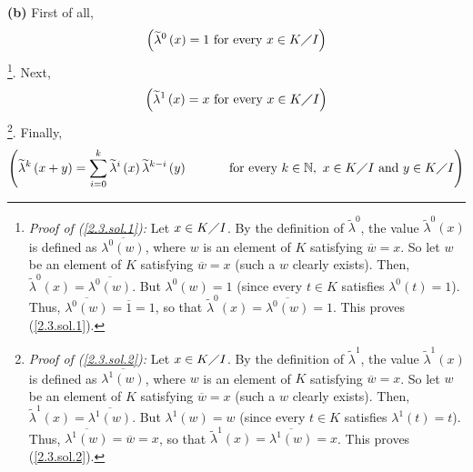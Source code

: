 \documentclass[numbers=enddot,12pt,final,onecolumn,notitlepage]{scrartcl}%
\begin{document}
\textbf{(b)} First of all,%
\begin{equation}
\left(  \widetilde{\lambda}^{0}\left(  x\right)  =1\text{ for every }x\in
K\diagup I\right)  \label{2.3.sol.1}%
\end{equation}
\footnote{\textit{Proof of (\ref{2.3.sol.1}):} Let $x\in K\diagup I$. By the
definition of $\widetilde{\lambda}^{0}$, the value $\widetilde{\lambda}%
^{0}\left(  x\right)  $ is defined as $\overline{\lambda^{0}\left(  w\right)
}$, where $w$ is an element of $K$ satisfying $\overline{w}=x$. So let $w$ be
an element of $K$ satisfying $\overline{w}=x$ (such a $w$ clearly exists).
Then, $\widetilde{\lambda}^{0}\left(  x\right)  =\overline{\lambda^{0}\left(
w\right)  }$. But $\lambda^{0}\left(  w\right)  =1$ (since every $t\in K$
satisfies $\lambda^{0}\left(  t\right)  =1$). Thus, $\overline{\lambda
^{0}\left(  w\right)  }=\overline{1}=1$, so that $\widetilde{\lambda}%
^{0}\left(  x\right)  =\overline{\lambda^{0}\left(  w\right)  }=1$. This
proves (\ref{2.3.sol.1}).}. Next,%
\begin{equation}
\left(  \widetilde{\lambda}^{1}\left(  x\right)  =x\text{ for every }x\in
K\diagup I\right)  \label{2.3.sol.2}%
\end{equation}
\footnote{\textit{Proof of (\ref{2.3.sol.2}):} Let $x\in K\diagup I$. By the
definition of $\widetilde{\lambda}^{1}$, the value $\widetilde{\lambda}%
^{1}\left(  x\right)  $ is defined as $\overline{\lambda^{1}\left(  w\right)
}$, where $w$ is an element of $K$ satisfying $\overline{w}=x$. So let $w$ be
an element of $K$ satisfying $\overline{w}=x$ (such a $w$ clearly exists).
Then, $\widetilde{\lambda}^{1}\left(  x\right)  =\overline{\lambda^{1}\left(
w\right)  }$. But $\lambda^{1}\left(  w\right)  =w$ (since every $t\in K$
satisfies $\lambda^{1}\left(  t\right)  =t$). Thus, $\overline{\lambda
^{1}\left(  w\right)  }=\overline{w}=x$, so that $\widetilde{\lambda}%
^{1}\left(  x\right)  =\overline{\lambda^{1}\left(  w\right)  }=x$. This
proves (\ref{2.3.sol.2}).}. Finally,%
\begin{equation}
\left(  \widetilde{\lambda}^{k}\left(  x+y\right)  =\sum_{i=0}^{k}%
\widetilde{\lambda}^{i}\left(  x\right)  \widetilde{\lambda}^{k-i}\left(
y\right)  \ \ \ \ \ \ \ \ \ \ \text{for every }k\in\mathbb{N},\text{ }x\in
K\diagup I\text{ and }y\in K\diagup I\right)  \label{2.3.sol.3}%
\end{equation}
\end{document}

